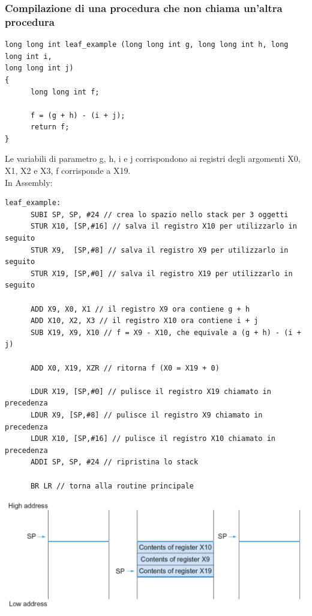 \documentclass[12pt,a4paper]{article}
\begin{document}
\subsubsection{Compilazione di una procedura che non chiama un'altra procedura}
\begin{verbatim}
long long int leaf_example (long long int g, long long int h, long long int i, 
long long int j)
{
      long long int f;
      
      f = (g + h) - (i + j);
      return f;
}
\end{verbatim}
Le variabili di parametro g, h, i e j corrispondono ai registri degli argomenti X0, X1, X2 e X3, f corrisponde a X19.\\
In Assembly:
\begin{verbatim}
leaf_example:
      SUBI SP, SP, #24 // crea lo spazio nello stack per 3 oggetti
      STUR X10, [SP,#16] // salva il registro X10 per utilizzarlo in seguito
      STUR X9,  [SP,#8] // salva il registro X9 per utilizzarlo in seguito
      STUR X19, [SP,#0] // salva il registro X19 per utilizzarlo in seguito
      
      ADD X9, X0, X1 // il registro X9 ora contiene g + h
      ADD X10, X2, X3 // il registro X10 ora contiene i + j
      SUB X19, X9, X10 // f = X9 - X10, che equivale a (g + h) - (i + j)
      
      ADD X0, X19, XZR // ritorna f (X0 = X19 + 0)
      
      LDUR X19, [SP,#0] // pulisce il registro X19 chiamato in precedenza
      LDUR X9, [SP,#8] // pulisce il registro X9 chiamato in precedenza
      LDUR X10, [SP,#16] // pulisce il registro X10 chiamato in precedenza
      ADDI SP, SP, #24 // ripristina lo stack
      
      BR LR // torna alla routine principale
\end{verbatim}
\begin{center}
\includegraphics[width=0.7\columnwidth]{img/stack_ex.png}
\end{center}
\end{document}
